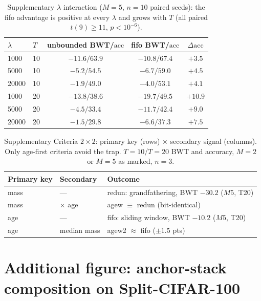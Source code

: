 \documentclass[11pt]{article}
\newcommand{\acc}{\mathrm{acc}}
\begin{document}
\begin{table}[htbp]
\centering\small
\caption{Supplementary $\lambda$ interaction ($M{=}5$, $n{=}10$ paired seeds): the
fifo advantage is positive at every $\lambda$ and grows with $T$
(all paired $t(9)\geq 11$, $p<10^{-6}$).}
\label{tab:supp-lambda}
\begin{tabular}{llccc}
\toprule
$\lambda$ & $T$ & unbounded BWT/$\acc$ & fifo BWT/$\acc$ & $\Delta\acc$ \\
\midrule
1000  & 10 & $-11.6 / 63.9$ & $-10.8 / 67.4$ & $+3.5$ \\
5000  & 10 & $-5.2 / 54.5$  & $-6.7 / 59.0$  & $+4.5$ \\
20000 & 10 & $-1.9 / 49.0$  & $-4.0 / 53.1$  & $+4.1$ \\
1000  & 20 & $-13.8 / 38.6$ & $-19.7 / 49.5$ & $+10.9$ \\
5000  & 20 & $-4.5 / 33.4$  & $-11.7 / 42.4$ & $+9.0$ \\
20000 & 20 & $-1.5 / 29.8$  & $-6.6 / 37.3$  & $+7.5$ \\
\bottomrule
\end{tabular}
\end{table}

\begin{table}[htbp]
\centering\small
\caption{Supplementary Criteria $2{\times}2$: primary key (rows) $\times$ secondary
signal (columns). Only age-first criteria avoid the trap.
$T{=}10$/$T{=}20$ BWT and accuracy, $M{=}2$ or $M{=}5$ as marked,
$n{=}3$.}
\label{tab:supp-criteria}
\begin{tabular}{lll}
\toprule
Primary key & Secondary & Outcome \\
\midrule
mass  & ---   & redun: grandfathering, BWT $-30.2$ ($M5$, T20) \\
mass  & $\times$ age & agew $\equiv$ redun (bit-identical) \\
age   & ---   & fifo: sliding window, BWT $-10.2$ ($M5$, T20) \\
age   & median mass & agew2 $\approx$ fifo ($\pm1.5$ pts) \\
\bottomrule
\end{tabular}
\end{table}


\section{Additional figure: anchor-stack composition on Split-CIFAR-100}
\label{appx:fig}
\end{document}
